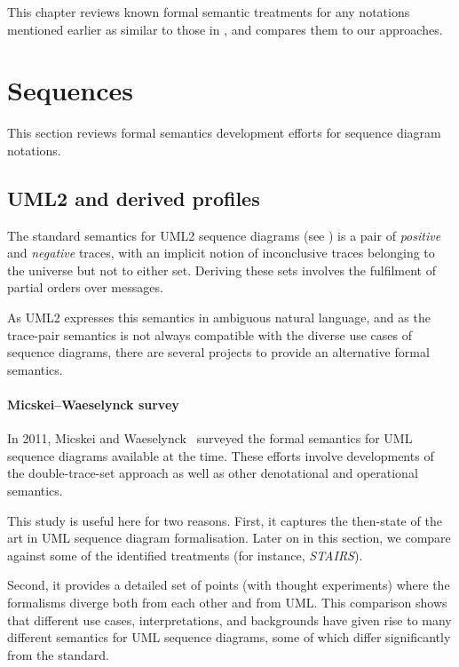
This chapter reviews known formal semantic treatments for any notations
mentioned earlier as similar to those in \langname, and compares them to
our approaches.

\section{Sequences}\label{sec:semantics-review-seq}

This section reviews formal semantics development efforts for sequence diagram
notations.

\subsection{UML2 and derived profiles}

The standard semantics for UML2 sequence diagrams (see
\cite[\S 17.2.3.1]{uml251}) is a pair of \emph{positive} and \emph{negative}
traces, with an implicit notion of inconclusive traces belonging to
the universe but not to either set.  Deriving these sets involves the
fulfilment of partial orders over messages.

As UML2 expresses this
semantics in ambiguous natural language, and as the trace-pair
semantics is not always compatible with the diverse use cases of sequence
diagrams, there are several projects to provide an alternative formal semantics.

\paragraph{Micskei--Waeselynck survey}

In 2011, Micskei and Waeselynck~\cite{Micskei11-UMLSeqSemaSurvey} surveyed
the formal semantics for UML sequence diagrams available at the time.  These
efforts involve developments of the double-trace-set approach as well as other
denotational and operational semantics.

This study is useful here for two reasons.  First, it captures the then-state of
the art in UML sequence diagram formalisation.  Later on in this section,
we compare against some of the identified treatments (for instance,
\emph{STAIRS}).

Second, it provides a detailed
set of points (with thought experiments) where the formalisms diverge both from
each other and from UML.
This comparison shows that different use cases, interpretations, and backgrounds
have given rise to many different semantics for UML sequence diagrams, some
of which differ significantly from the standard.

